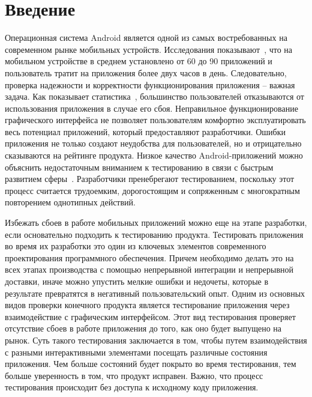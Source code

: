 \section{Введение}
\label{sec:Chapter0} 

Операционная система Android является одной из самых востребованных на современном рынке мобильных устройств. Исследования показывают~\cite{clement2020number}, что на мобильном устройстве в среднем установлено от 60 до 90 приложений и пользователь тратит на приложения более двух часов в день. Следовательно, проверка надежности и корректности функционирования приложения -- важная задача. Как показывает статистика~\cite{packard2015failing}, большинство пользователей отказываются от использования приложения в случае его сбоя. Неправильное функционирование графического интерфейса не позволяет пользователям комфортно эксплуатировать весь потенциал приложений, который предоставляют разработчики. Ошибки приложения не только создают неудобства для пользователей, но и отрицательно сказываются на рейтинге продукта. Низкое качество Android-приложений можно объяснить недостаточным вниманием к тестированию в связи с быстрым развитием сферы~\cite{kochhar2015understanding}. Разработчики пренебрегают тестированием, поскольку этот процесс считается трудоемким, дорогостоящим и сопряженным с многократным повторением однотипных действий.

Избежать сбоев в работе мобильных приложений можно еще на этапе разработки, если основательно подходить к тестированию продукта. Тестировать приложения во время их разработки это один из ключевых элементов современного проектирования программного обеспечения. Причем необходимо делать это на всех этапах производства с помощью непрерывной интеграции и непрерывной доставки, иначе можно упустить мелкие ошибки и недочеты, которые в результате превратятся в негативный пользовательский опыт. Одним из основных видов проверки конечного продукта является тестирование приложения через взаимодействие с графическим интерфейсом. Этот вид тестирования проверяет отсутствие сбоев в работе приложения до того, как оно будет выпущено на рынок. Суть такого тестирования заключается в том, чтобы путем взаимодействия с разными интерактивными элементами посещать различные состояния приложения. Чем больше состояний будет покрыто во время тестирования, тем больше уверенность в том, что продукт исправен. Важно, что процесс тестирования происходит без доступа к исходному коду приложения.

